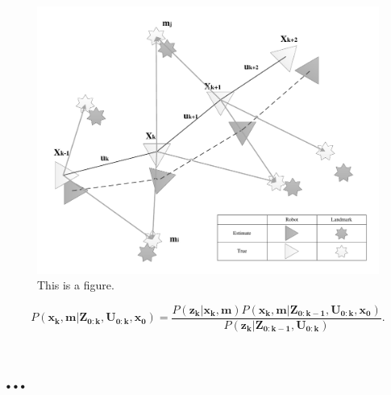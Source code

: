 \documentclass[a4paper,12pt]{report}
\begin{document}
\begin{figure}[h]
  \label{fig:SLAM}
  \includegraphics[scale=1,angle=0,width=180mm]{fig5.pdf}
  \caption{This is a figure.}
\end{figure}


\begin{equation}
P(\mathbf{x_k,m | Z_{0:k}, U_{0:k}, x_0}) = \frac{P(\mathbf{z_k | x_k, m})P(\mathbf{x_k, m | Z_{0:k-1}, U_{0:k},x_0})}{P(\mathbf{z_k | Z_{0:k-1}, U_{0:k}})}.
\end{equation}



\newpage
\section{...}


{} %

\end{document}
